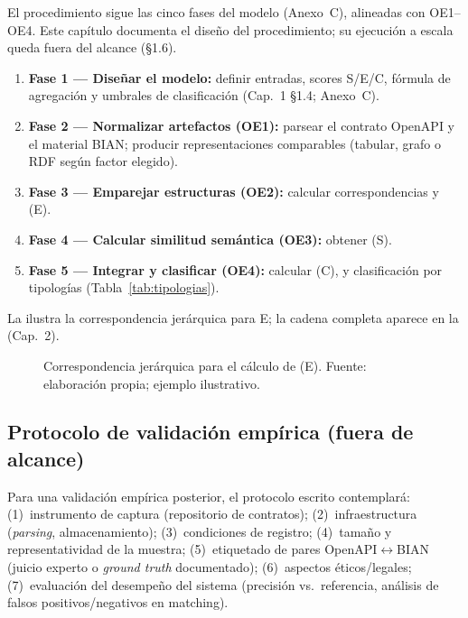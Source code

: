 El procedimiento sigue las cinco fases del modelo (Anexo~C), alineadas con OE1--OE4. Este capítulo
documenta el diseño del procedimiento; su ejecución a escala queda fuera del alcance (§1.6).

\begin{enumerate}
  \item \textbf{Fase 1 --- Diseñar el modelo:} definir entradas, scores S/E/C, fórmula de
        agregación y umbrales de clasificación (Cap.~1 §1.4; Anexo~C).
  \item \textbf{Fase 2 --- Normalizar artefactos (OE1):} parsear el contrato OpenAPI y el material
        BIAN; producir representaciones comparables (tabular, grafo o RDF según factor elegido).
  \item \textbf{Fase 3 --- Emparejar estructuras (OE2):} calcular correspondencias y
        \StructuralScore{} (E).
  \item \textbf{Fase 4 --- Calcular similitud semántica (OE3):} obtener \SemanticScore{} (S).
  \item \textbf{Fase 5 --- Integrar y clasificar (OE4):} calcular \CoverageScore{} (C),
        \AlignmentScore{} y clasificación por tipologías (Tabla~\ref{tab:tipologias}).
\end{enumerate}



La  ilustra la correspondencia jerárquica para E; la cadena completa
aparece en la  (Cap.~2).

\setcounter{figure}{6}
\begin{figure}[H]
  \centering
  \figCapSeven
  \caption{Correspondencia jerárquica para el cálculo de \StructuralScore{} (E). Fuente: elaboración
  propia; ejemplo ilustrativo.}
  \label{fig:proc-estructural}
\end{figure}

\subsection{Protocolo de validación empírica (fuera de alcance)}

Para una validación empírica posterior, el protocolo escrito contemplará: (1)~instrumento de captura
(repositorio de contratos); (2)~infraestructura (\textit{parsing}, almacenamiento);
(3)~condiciones de registro; (4)~tamaño y representatividad de la muestra; (5)~etiquetado de pares
OpenAPI$\leftrightarrow$BIAN (juicio experto o \textit{ground truth} documentado);
(6)~aspectos éticos/legales; (7)~evaluación del desempeño del sistema (precisión vs.\ referencia,
análisis de falsos positivos/negativos en matching).
